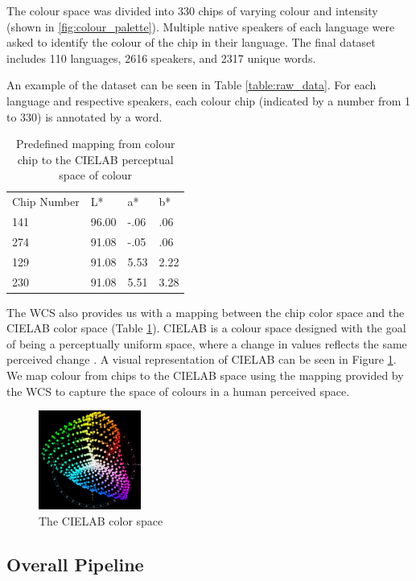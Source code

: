 \documentclass[11pt]{article}
\begin{document}
The colour space was divided into 330 chips of varying colour and intensity (shown in \ref{fig:colour_palette}). 
Multiple native speakers of each language were asked to identify the colour of the chip in their language.
The final dataset includes 110 languages, 2616 speakers, and 2317 unique words.  

An example of the dataset can be seen in Table \ref{table:raw_data}. 
For each language and respective speakers, each colour chip (indicated by a number from 1 to 330) is annotated by a word. 

\begin{table}[h]
\begin{tabular}{llll}
Chip Number & L*    & a*   & b*   \\
141  & 96.00 & -.06 & .06  \\
274  & 91.08 & -.05 & .06  \\
129  & 91.08 & 5.53 & 2.22 \\
230  & 91.08 & 5.51 & 3.28
\end{tabular}
\caption{Predefined mapping from colour chip to the CIELAB perceptual space of colour}
\label{table:lab_values}
\end{table}

The WCS also provides us with a mapping between the chip color space and the CIELAB color space (Table \ref{table:lab_values}).
CIELAB is a colour space designed with the goal of being a perceptually uniform space, where a change in values reflects the same perceived change \cite{CIELAB}.
A visual representation of CIELAB can be seen in Figure \ref{fig:cielab}.
We map colour from chips to the CIELAB space using the mapping provided by the WCS to capture the space of colours in a human perceived space.


\begin{figure}[h]
    \centering
    \includegraphics[width=0.3\textwidth]{docs/intro_rate_distortion/graphs/CIELAB_color_space_top_view.png}
    \caption{The CIELAB color space}
    \label{fig:cielab}
\end{figure}


\subsection{Overall Pipeline}
\label{ssec:overall_pipeling}
\end{document}
